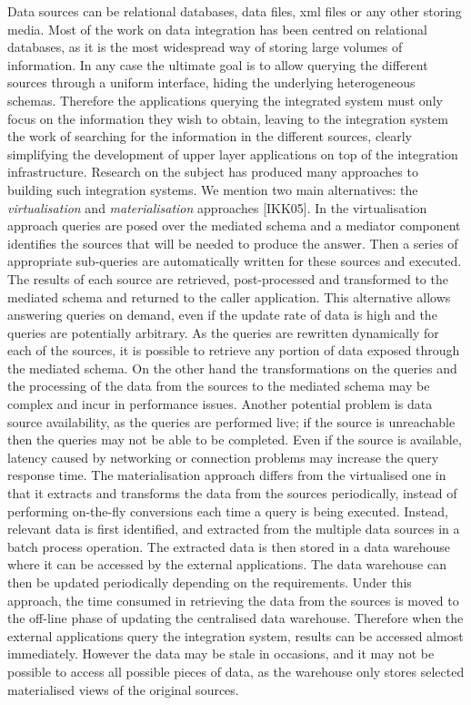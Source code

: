 Data sources can be relational databases, data files, xml files or any other storing media. Most of the work on data integration has been centred on relational databases, as it is the most widespread way of storing large volumes of information. In any case the ultimate goal is to allow querying the different sources through a uniform interface, hiding the underlying heterogeneous schemas. Therefore the applications querying the integrated system must only focus on the information they wish to obtain, leaving to the integration system the work of searching for the information in the different sources, clearly simplifying the development of upper layer applications on top of the integration infrastructure.
Research on the subject has produced many approaches to building such integration systems. We mention two main alternatives: the \textit{virtualisation} and \textit{materialisation} approaches [IKK05].
In the virtualisation approach queries are posed over the mediated schema and a mediator component identifies the sources that will be needed to produce the answer. Then a series of appropriate sub-queries are automatically written for these sources and executed. The results of each source are retrieved, post-processed and transformed to the mediated schema and returned to the caller application.
This alternative allows answering queries on demand, even if the update rate of data is high and the queries are potentially arbitrary. As the queries are rewritten dynamically for each of the sources, it is possible to retrieve any portion of data exposed through the mediated schema. On the other hand the transformations on the queries and the processing of the data from the sources to the mediated schema may be complex and incur in performance issues. Another potential problem is data source availability, as the queries are performed live; if the source is unreachable then the queries may not be able to be completed. Even if the source is available, latency caused by networking or connection problems may increase the query response time.
The materialisation approach differs from the virtualised one in that it extracts and transforms the data from the sources periodically, instead of performing on-the-fly conversions each time a query is being executed. Instead, relevant data is first identified, and extracted from the multiple data sources in a batch process operation. The extracted data is then stored in a data warehouse where it can be accessed by the external applications. The data warehouse can then be updated periodically depending on the requirements. Under this approach, the time consumed in retrieving the data from the sources is moved to the off-line phase of updating the centralised data warehouse. Therefore when the external applications query the integration system, results can be accessed almost immediately. However the data may be stale in occasions, and it may not be possible to access all possible pieces of data, as the warehouse only stores selected materialised views of the original sources.
